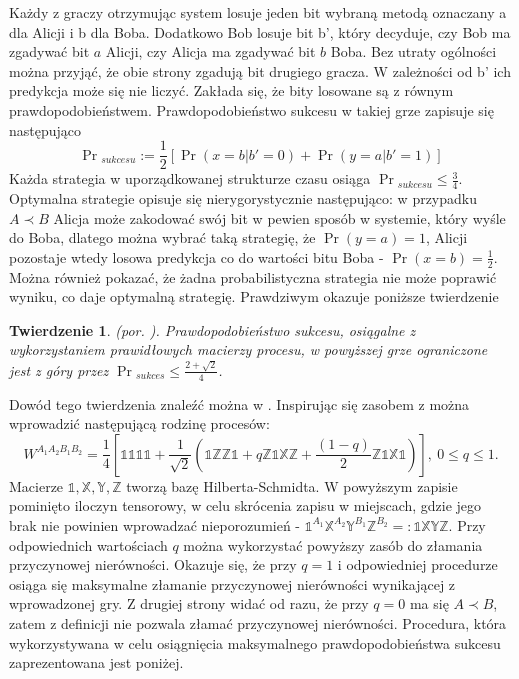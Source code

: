\documentclass[10pt]{article} %
\newtheorem{tw}{Twierdzenie}
\newcommand{\WAll}{W^{A_1A_2B_1B_2}}
\newcommand{\X}{\mathbb{X}}
\newcommand{\Y}{\mathbb{Y}}
\newcommand{\Z}{\mathbb{Z}}
\newcommand{\I}{\mathbb{1}}
\begin{document}
Każdy z graczy otrzymując system losuje jeden bit wybraną metodą oznaczany a dla Alicji i b dla Boba. Dodatkowo Bob losuje bit b', który decyduje, czy Bob ma zgadywać bit $a$ Alicji, czy Alicja ma zgadywać bit $b$ Boba. Bez utraty ogólności można przyjąć, że obie strony zgadują bit drugiego gracza. W zależności od b' ich 
predykcja może się nie liczyć. Zakłada się, że bity losowane są z równym prawdopodobieństwem. Prawdopodobieństwo sukcesu w takiej grze zapisuje się następująco
\begin{equation}
\Pr{}_{sukcesu} := \frac{1}{2} \left[ \Pr(x=b|b'=0) + \Pr(y=a|b' = 1)\right]
\end{equation}
Każda strategia w uporządkowanej strukturze czasu osiąga $\Pr{}_{sukcesu} \leq \frac{3}{4}$. Optymalna strategie opisuje się nierygorystycznie następująco: w przypadku $A \prec B$ Alicja może zakodować swój bit w pewien sposób w systemie, który wyśle do Boba, dlatego można wybrać taką strategię, że $\Pr(y=a) = 1$, Alicji pozostaje wtedy losowa predykcja co do wartości bitu Boba - $\Pr(x=b) = \frac{1}{2}$. Można również pokazać, że żadna probabilistyczna strategia nie może poprawić wyniku, co daje optymalną strategię. Prawdziwym okazuje poniższe twierdzenie 
\begin{tw} \label{cin}
(por. \cite{max_violation}).
Prawdopodobieństwo sukcesu, osiągalne z wykorzystaniem prawidłowych macierzy procesu, w powyższej grze ograniczone jest z góry przez $\Pr{}_{sukces} \leq \frac{2+\sqrt{2}}{4}$.
\end{tw}
Dowód tego twierdzenia znaleźć można w \cite{max_violation}.
Inspirując się zasobem z \cite{process_matrix} można wprowadzić następującą rodzinę procesów:
\begin{equation}
\WAll = \frac{1}{4}\left[
\I\I\I\I + \frac{1}{\sqrt{2}}(\I\Z\Z\I + q\Z\I\X\Z + \frac{(1-q)}{2}\Z\I\X\I)
\right],~ 0 \leq q \leq 1.
\end{equation}
Macierze $\I, \X, \Y, \Z$ tworzą bazę Hilberta-Schmidta. W powyższym zapisie pominięto iloczyn tensorowy, w celu skrócenia zapisu w miejscach, gdzie jego brak nie powinien wprowadzać nieporozumień - $\I^{A_1}\X^{A_2}\Y^{B_1}\Z^{B_2} =: \I\X\Y\Z$.
Przy odpowiednich wartościach $q$ można wykorzystać powyższy zasób do złamania przyczynowej nierówności. Okazuje się, że przy $q=1$ i odpowiedniej procedurze osiąga się maksymalne złamanie przyczynowej nierówności wynikającej z wprowadzonej gry. Z drugiej strony widać od razu, że przy $q=0$ ma się $A \prec B$, zatem z definicji nie pozwala złamać przyczynowej nierówności. Procedura, która wykorzystywana w celu osiągnięcia maksymalnego prawdopodobieństwa sukcesu zaprezentowana jest poniżej.
\end{document}
